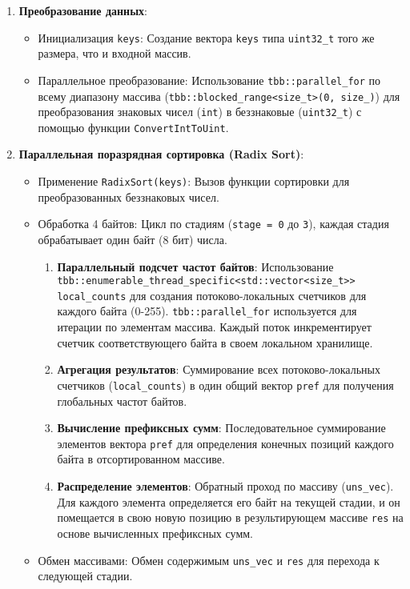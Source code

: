 \documentclass[12pt,a4paper]{extarticle}
\begin{document}
\begin{enumerate}
    
    \item \textbf{Преобразование данных}:
    \begin{itemize}
        \item Инициализация \texttt{keys}: Создание вектора \texttt{keys} типа \texttt{uint32\_t} того же размера, что и входной массив.
        \item Параллельное преобразование: Использование \texttt{tbb::parallel\_for} по всему диапазону массива (\texttt{tbb::blocked\_range<size\_t>(0, size\_)}) для преобразования знаковых чисел (\texttt{int}) в беззнаковые (\texttt{uint32\_t}) с помощью функции \texttt{ConvertIntToUint}.
    \end{itemize}
    
    \item \textbf{Параллельная поразрядная сортировка (Radix Sort)}:
    \begin{itemize}
        \item Применение \texttt{RadixSort(keys)}: Вызов функции сортировки для преобразованных беззнаковых чисел.
        \item Обработка 4 байтов: Цикл по стадиям (\texttt{stage = 0} до \texttt{3}), каждая стадия обрабатывает один байт (8 бит) числа.
        \begin{enumerate}
            \item \textbf{Параллельный подсчет частот байтов}:
                Использование \texttt{tbb::enumerable\_thread\_specific<std::vector<size\_t>> local\_counts} для создания потоково-локальных счетчиков для каждого байта (0-255).
                \texttt{tbb::parallel\_for} используется для итерации по элементам массива. Каждый поток инкрементирует счетчик соответствующего байта в своем локальном хранилище.
            \item \textbf{Агрегация результатов}:
                Суммирование всех потоково-локальных счетчиков (\texttt{local\_counts}) в один общий вектор \texttt{pref} для получения глобальных частот байтов.
            \item \textbf{Вычисление префиксных сумм}:
                Последовательное суммирование элементов вектора \texttt{pref} для определения конечных позиций каждого байта в отсортированном массиве.
            \item \textbf{Распределение элементов}:
                Обратный проход по массиву (\texttt{uns\_vec}). Для каждого элемента определяется его байт на текущей стадии, и он помещается в свою новую позицию в результирующем массиве \texttt{res} на основе вычисленных префиксных сумм.
        \end{enumerate}
        \item Обмен массивами: Обмен содержимым \texttt{uns\_vec} и \texttt{res} для перехода к следующей стадии.
    \end{itemize}
    

\end{enumerate}
\end{document}
